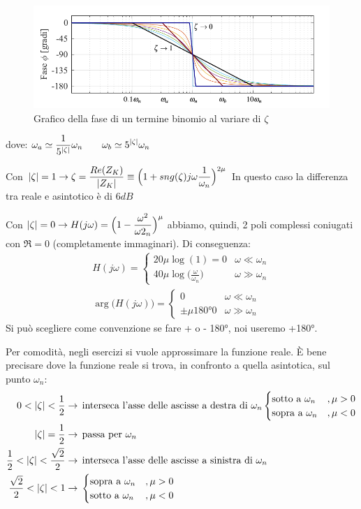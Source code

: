 \begin{figure}[H]
	\centering
	\includegraphics[width=0.7\linewidth]{immagini/cap6_Bode/bodeBin-Fas}
	\caption{Grafico della fase di un termine binomio al variare di $ \zeta $}
	\label{fig:bodeBin-Fas}
\end{figure}
dove: $\displaystyle \omega_a \simeq \frac{1}{5^{\lvert\zeta\rvert}}\omega_n \qquad \omega_b \simeq 5^{\lvert\zeta\rvert}\omega_n$


	Con $\displaystyle \lvert\zeta\rvert=1 \rightarrow \zeta =\frac{Re (Z_K)}{\lvert Z_K\rvert} \equiv \Big(1+sng(\zeta)j \omega \frac{1}{\omega_n}\Big)^{2\mu} $  In questo caso la differenza tra reale e asintotico è di $ 6 dB $
	
	Con $ \displaystyle \lvert\zeta\rvert = 0 \rightarrow H(j\omega) = \Big(1-\frac{\omega^2}{\omega2_n}\Big)^\mu $ abbiamo, quindi, 2 poli complessi coniugati con $ \Re =0 $ (completamente immaginari). Di conseguenza:
	\begin{gather*}
		H(j\omega)=
		\begin{cases}
			20\mu \log(1)=0 &\omega \ll \omega_n\\
			40\mu\log\big(\frac{\omega}{\omega_n}\big) &\omega \gg \omega_n
		\end{cases}\\
		\arg \big(H(j\omega)\big) = 
		\begin{cases}
			0 &\omega \ll \omega_n\\
			\pm \mu \ang{180} 0 &\omega \gg \omega_n
		\end{cases}
	\end{gather*}
Si può scegliere come convenzione se fare + o - \ang{180}, noi useremo +\ang{180}.

Per comodità, negli esercizi si vuole approssimare la funzione reale. È bene precisare dove la funzione reale si trova, in confronto a quella asintotica, sul punto $ \omega_n $:
\begin{align*}
	0<\lvert\zeta\rvert<\frac{1}{2} &\rightarrow \, \text{interseca l'asse delle ascisse a destra di $ \omega_n $}
		\begin{cases}
			\text{sotto a }\omega_n &,\mu >0\\
			\text{sopra a }\omega_n &,\mu <0
		\end{cases}\\
	\lvert\zeta\rvert =\frac{1}{2} &\rightarrow\, \text{passa per $ \omega_n $}\\
	\frac{1}{2}<\lvert\zeta\rvert<\frac{\sqrt{2}}{2} &\rightarrow \, \text{interseca l'asse delle ascisse a sinistra di $ \omega_n $}\\
	\frac{\sqrt{2}}{2}<\lvert\zeta\rvert<1 &\rightarrow \,
		\begin{cases}
			\text{sopra a }\omega_n &,\mu >0\\
			\text{sotto a }\omega_n &,\mu <0
		\end{cases}
\end{align*}



